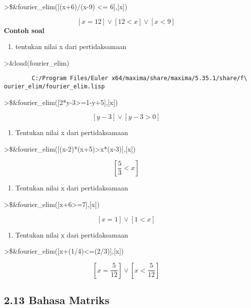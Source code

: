 \documentclass[
]{book}
\providecommand{\tightlist}{%
  \setlength{\itemsep}{0pt}\setlength{\parskip}{0pt}}
\begin{document}
\textgreater\$\&fourier\_elim({[}(x+6)/(x-9) \textless= 6{]},{[}x{]})

\[\left[ x=12 \right] \lor \left[ 12<x \right] \lor \left[ x<9 \right]\] \textbf{Contoh soal}

\begin{enumerate}
\def\labelenumi{\arabic{enumi}.}
\tightlist
\item
  tentukan nilai x dari pertidaksamaan
\end{enumerate}

\textgreater\&load(fourier\_elim)

\begin{verbatim}
        C:/Program Files/Euler x64/maxima/share/maxima/5.35.1/share/f\
ourier_elim/fourier_elim.lisp
\end{verbatim}

\textgreater\$\&fourier\_elim({[}2*y-3\textgreater=1-y+5{]},{[}x{]})

\[\left[ y-3 \right] \lor \left[ y-3>0 \right]\]

\begin{enumerate}
\def\labelenumi{\arabic{enumi}.}
\setcounter{enumi}{1}
\tightlist
\item
  Tentukan nilai x dari pertidaksamaan
\end{enumerate}

\textgreater\$\&fourier\_elim({[}(x-2)*(x+5)\textgreater x*(x-3){]},{[}x{]})

\[\left[ \frac{5}{3}<x \right]\]

\begin{enumerate}
\def\labelenumi{\arabic{enumi}.}
\setcounter{enumi}{2}
\tightlist
\item
  Tentukan nilai x dari pertidaksamaan
\end{enumerate}

\textgreater\$\&fourier\_elim({[}x+6\textgreater=7{]},{[}x{]})

\[\left[ x=1 \right] \lor \left[ 1<x \right]\]

\begin{enumerate}
\def\labelenumi{\arabic{enumi}.}
\setcounter{enumi}{3}
\tightlist
\item
  Tentukan nilai x dari pertidaksamaan
\end{enumerate}

\textgreater\$\&fourier\_elim({[}x+(1/4)\textless=(2/3){]},{[}x{]})

\[\left[ x=\frac{5}{12} \right] \lor \left[ x<\frac{5}{12} \right]\] 

\subsection{2.13 Bahasa Matriks}
\end{document}

